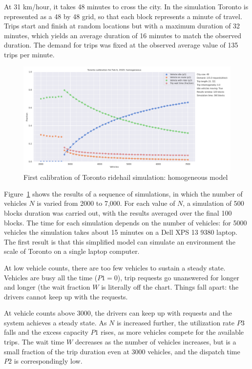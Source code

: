 \documentclass[
  letterpaper,
  DIV=11,
  numbers=noendperiod]{scrartcl}
\begin{document}
At 31 km/hour, it takes 48 minutes to cross the city. In the simulation
Toronto is represented as a 48 by 48 grid, so that each block represents
a minute of travel. Trips start and finish at random locations but with
a maximum duration of 32 minutes, which yields an average duration of 16
minutes to match the observed duration. The demand for trips was fixed
at the observed average value of 135 trips per minute.

\begin{figure}

{\centering \includegraphics{toronto_calibration_homogeneous.png}

}

\caption{\label{fig-toronto-homogeneous}First calibration of Toronto
ridehail simulation: homogeneous model}

\end{figure}

Figure~\ref{fig-toronto-homogeneous} shows the results of a sequence of
simulations, in which the number of vehicles \(N\) is varied from 2000
to 7,000. For each value of \(N\), a simulation of 500 blocks duration
was carried out, with the results averaged over the final 100 blocks.
The time for each simulation depends on the number of vehicles: for 5000
vehicles the simulation takes about 15 minutes on a Dell XPS 13 9380
laptop. The first result is that this simplified model can simulate an
environment the scale of Toronto on a single laptop computer.

At low vehicle counts, there are too few vehicles to sustain a steady
state. Vehicles are busy all the time (\(P1 = 0\)), trip requests go
unanswered for longer and longer (the wait fraction \(W\) is literally
off the chart. Things fall apart: the drivers cannot keep up with the
requests.

At vehicle counts above 3000, the drivers can keep up with requests and
the system achieves a steady state. As \(N\) is increased further, the
utilization rate \(P3\) falls and the excess capacity \(P1\) rises, as
more vehicles compete for the available trips. The wait time \(W\)
decreases as the number of vehicles increases, but is a small fraction
of the trip duration even at 3000 vehicles, and the dispatch time \(P2\)
is correspondingly low.
\end{document}
